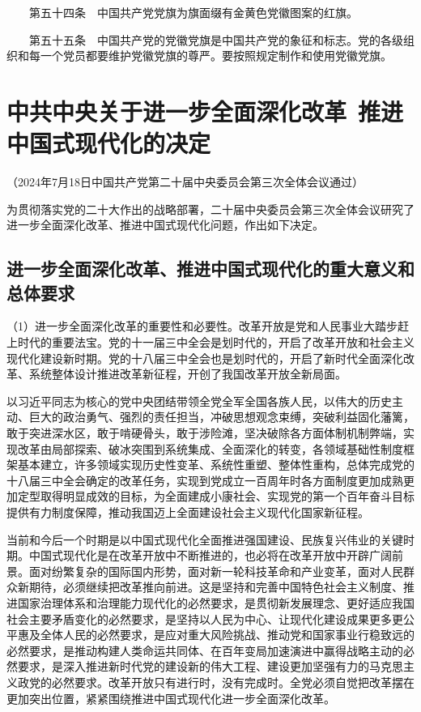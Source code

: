 　　第五十四条　中国共产党党旗为旗面缀有金黄色党徽图案的红旗。

　　第五十五条　中国共产党的党徽党旗是中国共产党的象征和标志。党的各级组织和每一个党员都要维护党徽党旗的尊严。要按照规定制作和使用党徽党旗。
    \section{中共中央关于进一步全面深化改革 推进中国式现代化的决定}
    （2024年7月18日中国共产党第二十届中央委员会第三次全体会议通过）

    为贯彻落实党的二十大作出的战略部署，二十届中央委员会第三次全体会议研究了进一步全面深化改革、推进中国式现代化问题，作出如下决定。

    \subsection{进一步全面深化改革、推进中国式现代化的重大意义和总体要求}

    （1）进一步全面深化改革的重要性和必要性。改革开放是党和人民事业大踏步赶上时代的重要法宝。党的十一届三中全会是划时代的，开启了改革开放和社会主义现代化建设新时期。党的十八届三中全会也是划时代的，开启了新时代全面深化改革、系统整体设计推进改革新征程，开创了我国改革开放全新局面。

    以习近平同志为核心的党中央团结带领全党全军全国各族人民，以伟大的历史主动、巨大的政治勇气、强烈的责任担当，冲破思想观念束缚，突破利益固化藩篱，敢于突进深水区，敢于啃硬骨头，敢于涉险滩，坚决破除各方面体制机制弊端，实现改革由局部探索、破冰突围到系统集成、全面深化的转变，各领域基础性制度框架基本建立，许多领域实现历史性变革、系统性重塑、整体性重构，总体完成党的十八届三中全会确定的改革任务，实现到党成立一百周年时各方面制度更加成熟更加定型取得明显成效的目标，为全面建成小康社会、实现党的第一个百年奋斗目标提供有力制度保障，推动我国迈上全面建设社会主义现代化国家新征程。

    当前和今后一个时期是以中国式现代化全面推进强国建设、民族复兴伟业的关键时期。中国式现代化是在改革开放中不断推进的，也必将在改革开放中开辟广阔前景。面对纷繁复杂的国际国内形势，面对新一轮科技革命和产业变革，面对人民群众新期待，必须继续把改革推向前进。这是坚持和完善中国特色社会主义制度、推进国家治理体系和治理能力现代化的必然要求，是贯彻新发展理念、更好适应我国社会主要矛盾变化的必然要求，是坚持以人民为中心、让现代化建设成果更多更公平惠及全体人民的必然要求，是应对重大风险挑战、推动党和国家事业行稳致远的必然要求，是推动构建人类命运共同体、在百年变局加速演进中赢得战略主动的必然要求，是深入推进新时代党的建设新的伟大工程、建设更加坚强有力的马克思主义政党的必然要求。改革开放只有进行时，没有完成时。全党必须自觉把改革摆在更加突出位置，紧紧围绕推进中国式现代化进一步全面深化改革。

